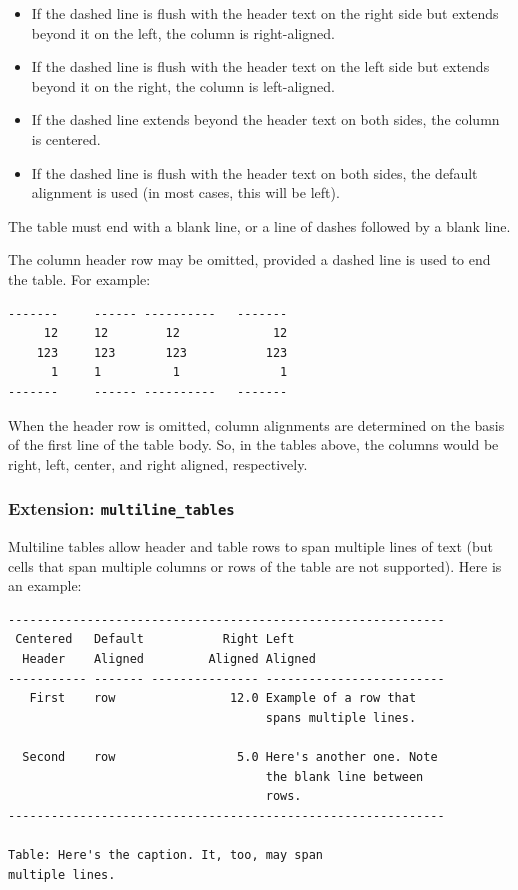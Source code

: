 \documentclass[
]{article}
\providecommand{\tightlist}{%
  \setlength{\itemsep}{0pt}\setlength{\parskip}{0pt}}
\begin{document}
\begin{itemize}
\tightlist
\item
  If the dashed line is flush with the header text on the right side but
  extends beyond it on the left, the column is right-aligned.
\item
  If the dashed line is flush with the header text on the left side but
  extends beyond it on the right, the column is left-aligned.
\item
  If the dashed line extends beyond the header text on both sides, the
  column is centered.
\item
  If the dashed line is flush with the header text on both sides, the
  default alignment is used (in most cases, this will be left).
\end{itemize}

The table must end with a blank line, or a line of dashes followed by a
blank line.

The column header row may be omitted, provided a dashed line is used to
end the table. For example:

\begin{verbatim}
-------     ------ ----------   -------
     12     12        12             12
    123     123       123           123
      1     1          1              1
-------     ------ ----------   -------
\end{verbatim}

When the header row is omitted, column alignments are determined on the
basis of the first line of the table body. So, in the tables above, the
columns would be right, left, center, and right aligned, respectively.

\hypertarget{extension-multiline_tables}{%
\subsubsection{\texorpdfstring{Extension:
\texttt{multiline\_tables}}{Extension: multiline\_tables}}\label{extension-multiline_tables}}

Multiline tables allow header and table rows to span multiple lines of
text (but cells that span multiple columns or rows of the table are not
supported). Here is an example:

\begin{verbatim}
-------------------------------------------------------------
 Centered   Default           Right Left
  Header    Aligned         Aligned Aligned
----------- ------- --------------- -------------------------
   First    row                12.0 Example of a row that
                                    spans multiple lines.

  Second    row                 5.0 Here's another one. Note
                                    the blank line between
                                    rows.
-------------------------------------------------------------

Table: Here's the caption. It, too, may span
multiple lines.
\end{verbatim}
\end{document}
